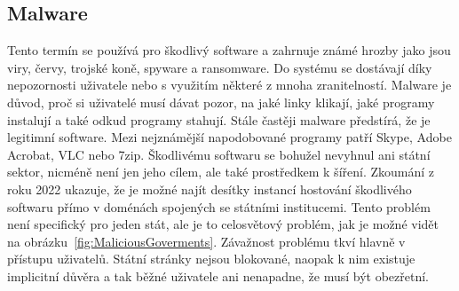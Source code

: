 \subsection{Malware}\label{subsec:malware}
Tento termín se používá pro škodlivý software a zahrnuje známé hrozby jako jsou viry, červy, trojské koně, spyware a ransomware.
Do systému se dostávají díky nepozornosti uživatele nebo s využitím některé z mnoha zranitelností\cite{cisco_most_common_attack}.
Malware je důvod, proč si uživatelé musí dávat pozor, na jaké linky klikají, jaké programy instalují a také odkud programy stahují.
Stále častěji malware předstírá, že je legitimní software.
Mezi nejznámější napodobované programy patří Skype, Adobe Acrobat, VLC nebo 7zip\cite{virustotal_report_findings}.
Škodlivému softwaru se bohužel nevyhnul ani státní sektor, nicméně není jen jeho cílem, ale také prostředkem k šíření.
Zkoumání z roku 2022 ukazuje, že je možné najít desítky instancí hostování škodlivého softwaru přímo v doménách spojených se státními institucemi\cite{virustotal_report_findings_goverment}.
Tento problém není specifický pro jeden stát, ale je to celosvětový problém, jak je možné vidět na obrázku~\ref{fig:MaliciousGoverments}.
Závažnost problému tkví hlavně v přístupu uživatelů.
Státní stránky nejsou blokované, naopak k nim existuje implicitní důvěra a tak běžné uživatele ani nenapadne, že musí být obezřetní.

~


